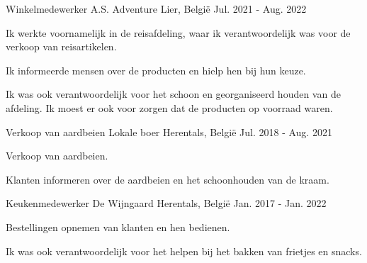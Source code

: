 

\begin{cventries}

    \cventry
      {Winkelmedewerker} %
      {A.S. Adventure} %
      {Lier, België} %
      {Jul. 2021 - Aug. 2022} %
      {
        \begin{cvitems} %
          \item {Ik werkte voornamelijk in de reisafdeling, waar ik verantwoordelijk was voor de verkoop van reisartikelen.}
          \item {Ik informeerde mensen over de producten en hielp hen bij hun keuze.}
          \item {Ik was ook verantwoordelijk voor het schoon en georganiseerd houden van de afdeling. Ik moest er ook voor zorgen dat de producten op voorraad waren.}
        \end{cvitems}
      }
  
    \cventry
      {Verkoop van aardbeien} %
      {Lokale boer} %
      {Herentals, België} %
      {Jul. 2018 - Aug. 2021} %
      {
        \begin{cvitems} %
          \item {Verkoop van aardbeien.}
          \item {Klanten informeren over de aardbeien en het schoonhouden van de kraam.}
        \end{cvitems}
      }
  
    \cventry
      {Keukenmedewerker} %
      {De Wijngaard} %
      {Herentals, België} %
      {Jan. 2017 - Jan. 2022} %
      {
        \begin{cvitems} %
          \item {Bestellingen opnemen van klanten en hen bedienen.}
          \item {Ik was ook verantwoordelijk voor het helpen bij het bakken van frietjes en snacks.}
        \end{cvitems}
      }
  
  \end{cventries}
  